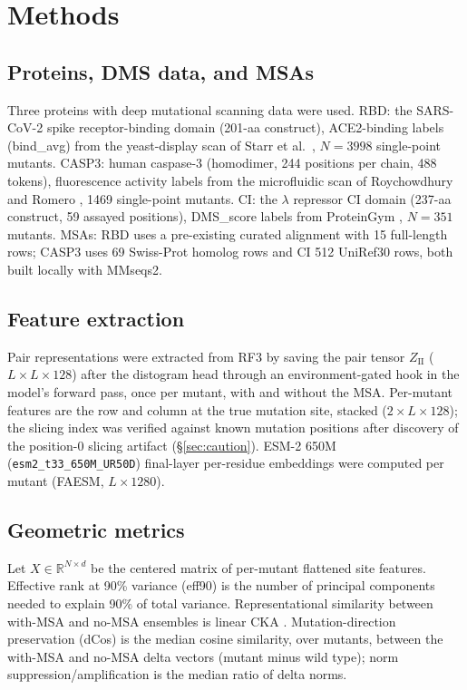 \documentclass[11pt]{article}
\newcommand{\eff}{eff90}
\begin{document}
\section{Methods}

\subsection{Proteins, DMS data, and MSAs}

Three proteins with deep mutational scanning data were used. RBD: the
SARS-CoV-2 spike receptor-binding domain (201-aa construct), ACE2-binding
labels (bind\_avg) from the yeast-display scan of Starr et al.\ \cite{starr2020},
$N{=}3998$ single-point mutants. CASP3: human caspase-3 (homodimer, 244
positions per chain, 488 tokens), fluorescence activity labels from the
microfluidic scan of Roychowdhury and Romero \cite{roychowdhury2022}, 1469
single-point mutants. CI: the $\lambda$ repressor CI domain (237-aa construct,
59 assayed positions), DMS\_score labels from ProteinGym \cite{notin2023},
$N{=}351$ mutants. MSAs: RBD uses a pre-existing curated alignment with 15
full-length rows; CASP3 uses 69 Swiss-Prot homolog rows and CI 512 UniRef30
rows, both built locally with MMseqs2.

\subsection{Feature extraction}

Pair representations were extracted from RF3 \cite{corley2025} by saving the
pair tensor $Z_{\mathrm{II}}$ ($L{\times}L{\times}128$) after the distogram
head through an environment-gated hook in the model's forward pass, once per
mutant, with and without the MSA. Per-mutant features are the row and column
at the true mutation site, stacked ($2{\times}L{\times}128$); the slicing
index was verified against known mutation positions after discovery of the
position-0 slicing artifact (\S\ref{sec:caution}). ESM-2 650M
(\texttt{esm2\_t33\_650M\_UR50D}) final-layer per-residue embeddings
\cite{lin2022} were computed per mutant (FAESM, $L{\times}1280$).

\subsection{Geometric metrics}

Let $X \in \mathbb{R}^{N\times d}$ be the centered matrix of per-mutant
flattened site features. Effective rank at 90\% variance (\eff{}) is the
number of principal components needed to explain 90\% of total variance.
Representational similarity between with-MSA and no-MSA ensembles is linear
CKA \cite{kornblith2019}. Mutation-direction preservation (dCos) is the median
cosine similarity, over mutants, between the with-MSA and no-MSA delta vectors
(mutant minus wild type); norm suppression/amplification is the median ratio
of delta norms.
\end{document}

